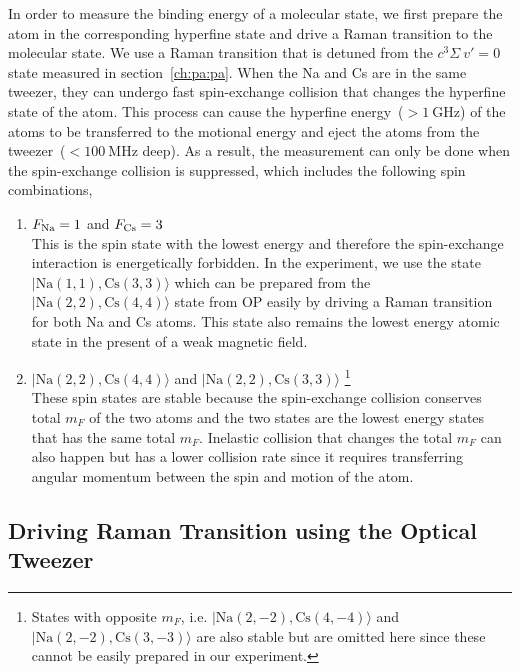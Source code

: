 In order to measure the binding energy of a molecular state,
we first prepare the atom in the corresponding hyperfine state
and drive a Raman transition to the molecular state.
We use a Raman transition that is detuned from the $c^3\Sigma\ v'=0$ state measured
in section~\ref{ch:pa:pa}.
When the Na and Cs are in the same tweezer,
they can undergo fast spin-exchange collision that changes the hyperfine state of the atom.
This process can cause the hyperfine energy~($>1~\mathrm{GHz}$) of the atoms
to be transferred to the motional energy
and eject the atoms from the tweezer~($<100~\mathrm{MHz}$ deep).
As a result, the measurement can only be done when the spin-exchange collision is suppressed,
which includes the following spin combinations,
\begin{enumerate}
\item $F_{\mathrm{Na}}=1$ and $F_{\mathrm{Cs}}=3$\\
  This is the spin state with the lowest energy and therefore the spin-exchange interaction
  is energetically forbidden.
  In the experiment, we use the state $|\mathrm{Na(1, 1),Cs(3, 3)}\rangle$
  which can be prepared from the $|\mathrm{Na(2, 2),Cs(4, 4)}\rangle$ state from OP
  easily by driving a Raman transition for both Na and Cs atoms.
  This state also remains the lowest energy atomic state in the present of a weak magnetic field.
\item $|\mathrm{Na(2, 2),Cs(4, 4)}\rangle$ and $|\mathrm{Na(2, 2),Cs(3, 3)}\rangle$
  \footnote{States with opposite $m_F$, i.e.
    $|\mathrm{Na(2, -2),Cs(4, -4)}\rangle$ and $|\mathrm{Na(2, -2),Cs(3, -3)}\rangle$ are also stable
    but are omitted here since these cannot be easily prepared in our experiment.}\\
  These spin states are stable because the spin-exchange collision conserves total $m_F$
  of the two atoms and
  the two states are the lowest energy states that has the same total $m_F$.
  Inelastic collision that changes the total $m_F$ can also happen
  but has a lower collision rate since it requires transferring angular momentum
  between the spin and motion of the atom.
\end{enumerate}

\subsection{Driving Raman Transition using the Optical Tweezer}
\label{ch:raman-spectroscopy:states:raman-tweezer}

